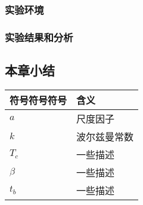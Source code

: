 \subsubsection{实验环境}

\subsubsection{实验结果和分析}


\subsection{本章小结}


\begin{table}[htb]
    \centering
    \captionsetup{font=footnotesize}
    \label{tab:符号对照表A}
    \begin{tabular}{>{\centering\arraybackslash}p{}>{\centering\arraybackslash}p{}}
        \toprule
        符号符号符号     & 含义       \\ 
        \midrule
        $a$     & 尺度因子    \\
        $k$     & 波尔兹曼常数 \\
        $T_c$   & 一些描述    \\
        $\beta$ & 一些描述    \\
        $t_b$   & 一些描述    \\
        \bottomrule
    \end{tabular}
\end{table}